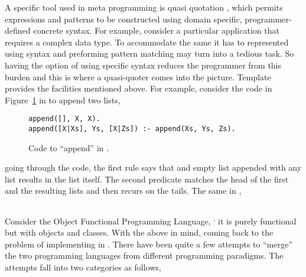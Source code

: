 \documentclass[thesis-solanki.tex]{subfiles}
\begin{document}
A specific tool used in meta programming is quasi quotation \cite{mainland2007s,haskellquasi,wikiquasi},
which permits
 expressions and patterns to be constructed using domain specific, programmer-defined concrete
syntax.
For example, consider a particular application that requires a complex data type.
To accommodate the same it has to represented using  syntax and preforming pattern matching may
turn into a tedious task.
So having the option of using specific syntax reduces the programmer from this burden and this is where a
quasi-quoter comes into the picture.
Template  provides the facilities mentioned above.
For example, consider the code in Figure~\ref{fig:append-prolog}
in  to append two lists,
\begin{figure}[h]
\begin{verbatim}
append([], X, X).
append([X|Xs], Ys, [X|Zs]) :- append(Xs, Ys, Zs).
\end{verbatim}    
\vspace*{-0.8\baselineskip}
\caption{Code to ``append'' in \protect{}.}
\label{fig:append-prolog}
\end{figure}
going through the code, the first rule says that and empty list appended with any list results in the list itself.
The second predicate matches the head of the first and the resulting lists and then recurs on the tails.
The same in ,
\inputminted[linenos]{haskell}{append.pl}

Consider the Object Functional Programming Language,  \cite{website:scala}\textsuperscript{,}
it is purely functional but with objects and classes.
With the above in mind, coming back to the problem of implementing  in .
There have been quite a few attempts to ``merge'' the two programming languages from different programming paradigms.
The attempts fall into two categories as follows,
\end{document}

